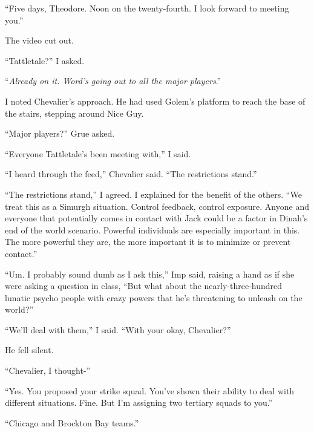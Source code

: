 ``Five days, Theodore.  Noon on the twenty-fourth.  I look forward to meeting you.''



The video cut out.



``Tattletale?'' I asked.



``\emph{Already on it.  Word's going out to all the major players}.''



I noted Chevalier's approach.  He had used Golem's platform to reach the base of the stairs, stepping around Nice Guy.



``Major players?'' Grue asked.



``Everyone Tattletale's been meeting with,'' I said.



``I heard through the feed,'' Chevalier said.  ``The restrictions stand.''



``The restrictions stand,'' I agreed.  I explained for the benefit of the others.  ``We treat this as a Simurgh situation.  Control feedback, control exposure.  Anyone and everyone that potentially comes in contact with Jack could be a factor in Dinah's end of the world scenario.  Powerful individuals are especially important in this.  The more powerful they are, the more important it is to minimize or prevent contact.''



``Um.  I probably sound dumb as I ask this,'' Imp said, raising a hand as if she were asking a question in class, ``But what about the nearly-three-hundred lunatic psycho people with crazy powers that he's threatening to unleash on the world?''



``We'll deal with them,'' I said.  ``With your okay, Chevalier?''



He fell silent.



``Chevalier, I thought-''



``Yes.  You proposed your strike squad. You've shown their ability to deal with different situations.  Fine.  But I'm assigning two tertiary squads to you.''



``Chicago and Brockton Bay teams.''



